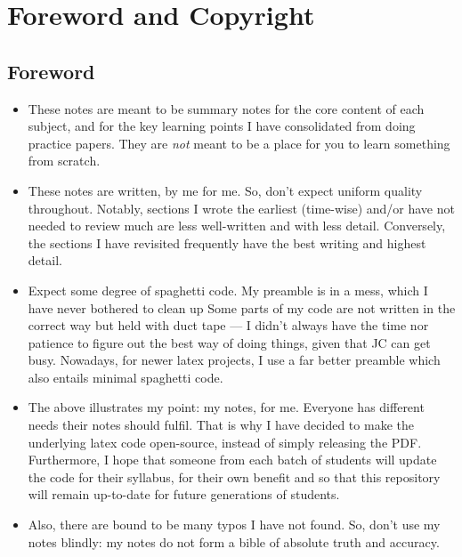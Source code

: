 \setcounter{chapter}{-1}
\chapter{Foreword and Copyright}
\section*{Foreword}
\begin{itemize}
    \item These notes are meant to be summary notes for the core content of each subject, and for the key learning points I have consolidated from doing practice papers. They are \emph{not} meant to be a place for you to learn something from scratch.
    \item These notes are written, by me for me. So, don't expect uniform quality throughout. Notably, sections I wrote the earliest (time-wise) and/or have not needed to review much are less well-written and with less detail. Conversely, the sections I have revisited frequently have the best writing and highest detail.
    \item Expect some degree of spaghetti code. My preamble is in a mess, which I have never bothered to clean up Some parts of my code are not written in the correct way but held with duct tape --- I didn't always have the time nor patience to figure out the best way of doing things, given that JC can get busy. Nowadays, for newer latex projects, I use a far better preamble which also entails minimal spaghetti code.
    \item The above illustrates my point: my notes, for me. Everyone has different needs their notes should fulfil. That is why I have decided to make the underlying latex code open-source, instead of simply releasing the PDF. Furthermore, I hope that someone from each batch of students will update the code for their syllabus, for their own benefit and so that this repository will remain up-to-date for future generations of students.
    \item Also, there are bound to be many typos I have not found. So, don't use my notes blindly: my notes do not form a bible of absolute truth and accuracy.
\end{itemize}
